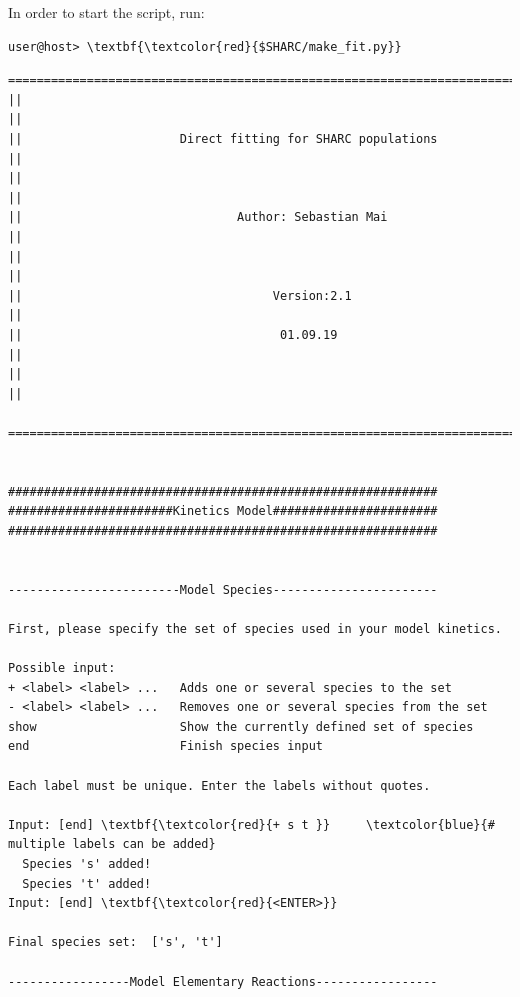 \documentclass[a4paper,11pt,DIV=15,openany]{scrbook}
\begin{document}
In order to start the script, run:
\begin{Verbatim}[commandchars=\\\{\}]
user@host> \textbf{\textcolor{red}{$SHARC/make_fit.py}}
\end{Verbatim}


\begin{oframed}
\footnotesize\begin{Verbatim}[commandchars=\\\{\}]
  ================================================================================
||                                                                                ||
||                      Direct fitting for SHARC populations                      ||
||                                                                                ||
||                              Author: Sebastian Mai                             ||
||                                                                                ||
||                                   Version:2.1                                  ||
||                                    01.09.19                                    ||
||                                                                                ||
  ================================================================================


############################################################
#######################Kinetics Model#######################
############################################################


------------------------Model Species-----------------------

First, please specify the set of species used in your model kinetics.

Possible input:
+ <label> <label> ...   Adds one or several species to the set
- <label> <label> ...   Removes one or several species from the set
show                    Show the currently defined set of species
end                     Finish species input

Each label must be unique. Enter the labels without quotes.

Input: [end] \textbf{\textcolor{red}{+ s t }}     \textcolor{blue}{# multiple labels can be added}
  Species 's' added!
  Species 't' added!
Input: [end] \textbf{\textcolor{red}{<ENTER>}}

Final species set:  ['s', 't']

-----------------Model Elementary Reactions-----------------


\end{Verbatim}
\end{oframed}
\end{document}
